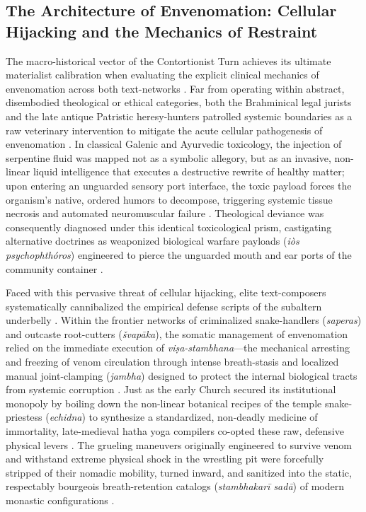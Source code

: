 \documentclass[11pt,letterpaper]{article}
\begin{document}
\subsection{The Architecture of Envenomation: Cellular Hijacking and the Mechanics of Restraint}

The macro-historical vector of the Contortionist Turn achieves its ultimate materialist calibration when evaluating the explicit clinical mechanics of envenomation across both text-networks \cite{McCartneyd, McCartneye}. Far from operating within abstract, disembodied theological or ethical categories, both the Brahminical legal jurists and the late antique Patristic heresy-hunters patrolled systemic boundaries as a raw veterinary intervention to mitigate the acute cellular pathogenesis of envenomation \cite{McCartneyd, McCartneye}. In classical Galenic and Ayurvedic toxicology, the injection of serpentine fluid was mapped not as a symbolic allegory, but as an invasive, non-linear liquid intelligence that executes a destructive rewrite of healthy matter; upon entering an unguarded sensory port interface, the toxic payload forces the organism's native, ordered humors to decompose, triggering systemic tissue necrosis and automated neuromuscular failure \cite{McCartneyd, McCartneye}. Theological deviance was consequently diagnosed under this identical toxicological prism, castigating alternative doctrines as weaponized biological warfare payloads (\textit{i\`{o}s psychophth\'{o}ros}) engineered to pierce the unguarded mouth and ear ports of the community container \cite{McCartneye}.

Faced with this pervasive threat of cellular hijacking, elite text-composers systematically cannibalized the empirical defense scripts of the subaltern underbelly \cite{Birch2024, McCartneyd}. Within the frontier networks of criminalized snake-handlers (\textit{saperas}) and outcaste root-cutters (\textit{\v{s}vap\={a}ka}), the somatic management of envenomation relied on the immediate execution of \textit{viṣa-stambhana}---the mechanical arresting and freezing of venom circulation through intense breath-stasis and localized manual joint-clamping (\textit{jambha}) designed to protect the internal biological tracts from systemic corruption \cite{Birch2024, McCartneyd}. Just as the early Church secured its institutional monopoly by boiling down the non-linear botanical recipes of the temple snake-priestess (\textit{echidna}) to synthesize a standardized, non-deadly medicine of immortality, late-medieval hatha yoga compilers co-opted these raw, defensive physical levers \cite{Birch2024, McCartneye}. The grueling maneuvers originally engineered to survive venom and withstand extreme physical shock in the wrestling pit were forcefully stripped of their nomadic mobility, turned inward, and sanitized into the static, respectably bourgeois breath-retention catalogs (\textit{stambhakarī sadā}) of modern monastic configurations \cite{Birch2024, McCartneyd}.
\end{document}
